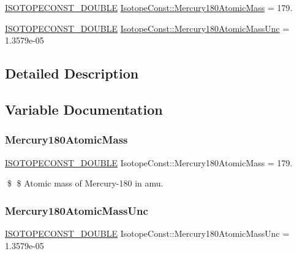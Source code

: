 \begin{DoxyCompactItemize}
\item 
\mbox{\hyperlink{group___isotope_const-_macros_ga8f45a7272ce02c0b4c65c44636ed719a}{I\+S\+O\+T\+O\+P\+E\+C\+O\+N\+S\+T\+\_\+\+D\+O\+U\+B\+LE}} \mbox{\hyperlink{group___isotope_const-_mercury-_hg180_ga2609da77b6111b8a2615d79483f46f30}{Isotope\+Const\+::\+Mercury180\+Atomic\+Mass}} = 179.
\item 
\mbox{\hyperlink{group___isotope_const-_macros_ga8f45a7272ce02c0b4c65c44636ed719a}{I\+S\+O\+T\+O\+P\+E\+C\+O\+N\+S\+T\+\_\+\+D\+O\+U\+B\+LE}} \mbox{\hyperlink{group___isotope_const-_mercury-_hg180_ga7bb24f54cff2b6a4f4f2a4d7e6d111be}{Isotope\+Const\+::\+Mercury180\+Atomic\+Mass\+Unc}} = 1.\+3579e-\/05
\end{DoxyCompactItemize}


\subsection{Detailed Description}


\subsection{Variable Documentation}
\mbox{\label{group___isotope_const-_mercury-_hg180_ga2609da77b6111b8a2615d79483f46f30}} 
\subsubsection{\texorpdfstring{Mercury180\+Atomic\+Mass}{Mercury180AtomicMass}}
{\footnotesize\ttfamily \mbox{\hyperlink{group___isotope_const-_macros_ga8f45a7272ce02c0b4c65c44636ed719a}{I\+S\+O\+T\+O\+P\+E\+C\+O\+N\+S\+T\+\_\+\+D\+O\+U\+B\+LE}} Isotope\+Const\+::\+Mercury180\+Atomic\+Mass = 179.}

\$ \$ Atomic mass of Mercury-\/180 in amu. \mbox{\label{group___isotope_const-_mercury-_hg180_ga7bb24f54cff2b6a4f4f2a4d7e6d111be}} 
\subsubsection{\texorpdfstring{Mercury180\+Atomic\+Mass\+Unc}{Mercury180AtomicMassUnc}}
{\footnotesize\ttfamily \mbox{\hyperlink{group___isotope_const-_macros_ga8f45a7272ce02c0b4c65c44636ed719a}{I\+S\+O\+T\+O\+P\+E\+C\+O\+N\+S\+T\+\_\+\+D\+O\+U\+B\+LE}} Isotope\+Const\+::\+Mercury180\+Atomic\+Mass\+Unc = 1.\+3579e-\/05}

